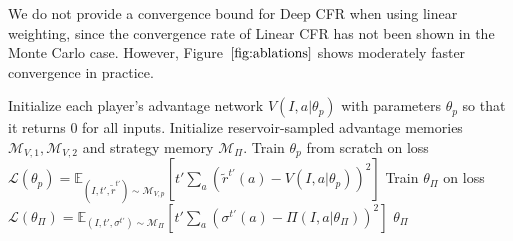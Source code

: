 \documentclass{article}
\begin{document}
We do not provide a convergence bound for Deep CFR when using linear weighting, since the convergence rate of Linear CFR has not been shown in the Monte Carlo case. However, Figure~$\ref{fig:ablations}$ shows moderately faster convergence in practice.

\begin{algorithm*}[!ht]
\caption{Deep Counterfactual Regret Minimization}
\begin{algorithmic}
\State Initialize each player's advantage network $V(I,a|\theta_p)$ with parameters $\theta_p$ so that it returns 0 for all inputs.
\State Initialize reservoir-sampled advantage memories $\mathcal{M}_{V,1}, \mathcal{M}_{V,2}$ and strategy memory $\mathcal{M}_{\Pi}$.
        \State {} 
    \EndFor
  \State Train $\theta_p$ from scratch on loss $\mathcal{L}(\theta_p)=\mathbb{E}_{(I, t', \tilde{r}^{t'}) \sim \mathcal{M}_{V,p}}\left[ t' \sum_a \left( \tilde{r}^{t'}(a) - V(I, a|\theta_p)\right)^2\right]$
\EndFor
\EndFor
  \State Train $\theta_\Pi$ on loss $\mathcal{L}(\theta_\Pi)=\mathbb{E}_{(I,t',\sigma^{t'}) \sim \mathcal{M}_{\Pi}}\left[ t' \sum_a \left(\sigma^{t'}(a) - \Pi(I, a|\theta_\Pi)\right)^2\right]$ %
\State \Return $\theta_\Pi$
\EndFunction
\end{algorithmic}
\label{alg:deepcfr}
\end{algorithm*}
\end{document}
